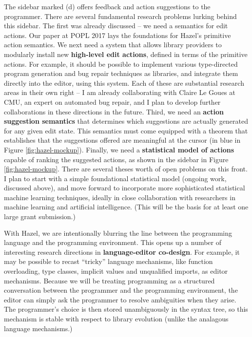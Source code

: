 \documentclass[10pt]{article}
\begin{document}
The sidebar marked (d) offers feedback and action suggestions to the programmer. There are several fundamental research problems lurking behind this sidebar. The first was already discussed -- we need a semantics for edit actions. Our paper at POPL 2017 lays the foundations for Hazel's primitive action semantics. We next need a system that allows library providers to modularly install new \textbf{high-level edit actions}, defined in terms of the primitive actions. For example, it should be possible to implement various type-directed program generation and bug repair techniques as libraries, and integrate them directly into the editor, using this system. Each of these are substantial research areas in their own right -- I am already collaborating with Claire Le Goues at CMU, an expert on automated bug repair, and I plan to develop further collaborations in these directions in the future. Third, we need an \textbf{action suggestion semantics} that determines which suggestions are actually generated for any given edit state. This semantics must come equipped with a theorem that establishes that the suggestions offered are meaningful at the cursor (in blue in Figure \ref{fig:hazel-mockup}).  Finally, we need a \textbf{statistical model of actions} capable of ranking the suggested actions, as shown in the sidebar in Figure \ref{fig:hazel-mockup}. There are several theses worth of open problems on this front. I plan to start with a simple foundational statistical model (ongoing work, discussed above), and move forward to incorporate more sophisticated statistical machine learning techniques, ideally in close collaboration with researchers in machine learning and artificial intelligence. (This will be the basis for at least one large grant submission.)

With Hazel, we are intentionally blurring the line between the programming language and the programming environment. This opens up a number of interesting research directions in \textbf{language-editor co-design}. For example, it may be possible to recast  ``tricky'' language mechanisms, like function overloading, type classes, implicit values and unqualified imports, as editor mechanisms. Because we will be treating programming as a structured conversation between the programmer and the programming environment, the editor can simply ask the programmer to resolve ambiguities when they arise. The programmer's choice is then stored unambiguously in the syntax tree, so this mechanism is stable with respect to library evolution (unlike the analagous language mechanisms.) 
\end{document}
